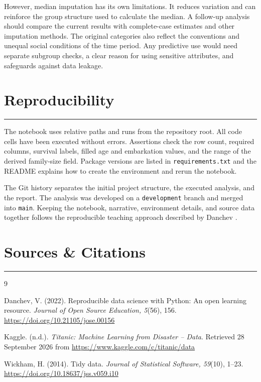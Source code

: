 \documentclass[11pt,a4paper]{article}
\newcommand{\reportsection}[1]{%
  \section{#1}
  \vspace{-0.4em}
  \textcolor{rulegray}{\rule{\textwidth}{0.5pt}}
  \vspace{0.2em}
}
\begin{document}
However, median imputation has its own limitations. It reduces variation
and can reinforce the group structure used to calculate the median. A follow-up
analysis should compare the current results with complete-case estimates and other
imputation methods. The original categories also reflect the conventions and unequal
social conditions of the time period. Any predictive use would need separate subgroup
checks, a clear reason for using sensitive attributes, and safeguards against
data leakage.

\reportsection{Reproducibility}

The notebook uses relative paths and runs from the repository root. All code
cells have been executed without errors. Assertions check the row count, required
columns, survival labels, filled age and embarkation values, and the range of the
derived family-size field. Package versions are listed in \texttt{requirements.txt}
and the README explains how to create the environment and rerun the notebook.

The Git history separates the initial project structure, the executed analysis,
and the report. The analysis was developed on a \texttt{development} branch and
merged into \texttt{main}. Keeping the notebook, narrative, environment details,
and source data together follows the reproducible teaching approach described by
Danchev \cite{danchev2022}.

\reportsection{Sources \& Citations}

\begin{thebibliography}{9}

Danchev, V. (2022). Reproducible data science with Python: An open learning
resource. \emph{Journal of Open Source Education, 5}(56), 156.
\url{https://doi.org/10.21105/jose.00156}

Kaggle. (n.d.). \emph{Titanic: Machine Learning from Disaster -- Data}.
Retrieved 28 September 2026 from
\url{https://www.kaggle.com/c/titanic/data}

Wickham, H. (2014). Tidy data. \emph{Journal of Statistical Software, 59}(10),
1--23. \url{https://doi.org/10.18637/jss.v059.i10}

\end{thebibliography}
\end{document}
